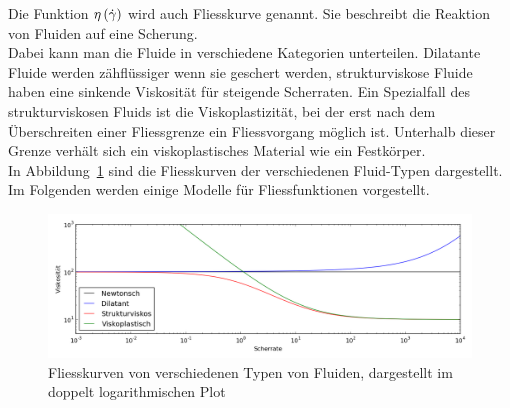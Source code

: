 Die Funktion $\eta\left( \dot\gamma \right)$ wird auch Fliesskurve genannt. Sie beschreibt die Reaktion von Fluiden auf eine Scherung.\\
Dabei kann man die Fluide in verschiedene Kategorien unterteilen. Dilatante Fluide werden zähflüssiger wenn sie geschert werden, strukturviskose Fluide haben eine sinkende Viskosität für steigende Scherraten.
Ein Spezialfall des strukturviskosen Fluids ist die Viskoplastizität, bei der erst nach dem Überschreiten einer Fliessgrenze ein Fliessvorgang möglich ist. Unterhalb dieser Grenze verhält sich ein viskoplastisches Material wie ein Festkörper.\\
In Abbildung~\ref{fig:fliessKurven} sind die Fliesskurven der verschiedenen Fluid-Typen dargestellt. Im Folgenden werden einige Modelle für Fliessfunktionen vorgestellt. 
%
%
\begin{figure}
    \centering
    \includegraphics[width=\textwidth]{figures/Fliesskurven.png}
    \caption{Fliesskurven von verschiedenen Typen von Fluiden, dargestellt im doppelt logarithmischen Plot}
    \label{fig:fliessKurven}
\end{figure}
%
